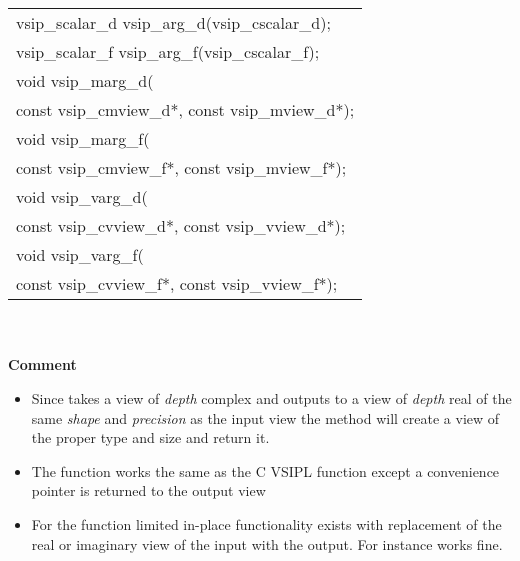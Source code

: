 \\\cvsiplh
\afh
\\\hspace*{.04\textwidth} {
\ttfamily
\begin{tabular}[H]{l}
vsip\_scalar\_d vsip\_arg\_d(vsip\_cscalar\_d);\\
vsip\_scalar\_f vsip\_arg\_f(vsip\_cscalar\_f);\\
void vsip\_marg\_d(\\*\hspace{.5cm}const vsip\_cmview\_d*, const vsip\_mview\_d*);\\
void vsip\_marg\_f(\\*\hspace{.5cm}const vsip\_cmview\_f*, const vsip\_mview\_f*);\\
void vsip\_varg\_d(\\*\hspace{.5cm}const vsip\_cvview\_d*, const vsip\_vview\_d*);\\
void vsip\_varg\_f(\\*\hspace{.5cm}const vsip\_cvview\_f*, const vsip\_vview\_f*);\\
\end{tabular}
}
\\\pyjvsiph
{}
\\ \hspace*{.8cm}\textbf{Comment}\\
\hspace*{.8cm}\parbox{11cm}{\vspace*{.2cm}
\begin{itemize}
\item{Since  takes a view of \emph{depth} complex and outputs to a view of \emph{depth} real of the same \emph{shape} and \emph{precision} as the input view the  method will create a view of the proper type and size and return it.}
\item{The  function works the same as the C VSIPL function except a convenience pointer is returned to the output view}
\item{For the function limited in-place functionality exists with replacement of the real or imaginary view of the input with the output. For instance  works fine.}
\end{itemize}}
